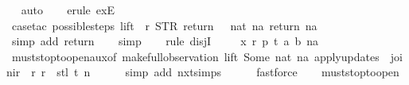 \begin{isabellebody}
\ \isamarkupfalse%
\ auto{\isacharbrackleft}{}{\isacharbrackright}\isanewline
\ \ \isamarkupfalse%
\ {\isacharparenleft}erule\ exE{\isacharparenright}\isanewline
\ \ \isamarkupfalse%
\ {\isacharparenleft}case{\isacharunderscore}tac\ {\isachardoublequoteopen}possible{\isacharunderscore}steps\ lift\ {}\ r\ {\isacharparenleft}STR\ {\isacharprime}{\isacharprime}return{\isacharprime}{\isacharprime}{\isacharparenright}\ {\isacharbrackleft}{\isacharbrackright}\ {\isacharequal}\ {\isacharbraceleft}{\isacharbar}{\isacharparenleft}nat\ na{\isacharcomma}\ return\ na{\isacharparenright}{\isacharbar}{\isacharbraceright}{\isachardoublequoteclose}{\isacharparenright}\isanewline
\ \ \isamarkupfalse%
\ \isamarkupfalse%
\ {\isacharparenleft}simp\ add{\isacharcolon}\ return{\isacharparenright}\isanewline
\ \ \isamarkupfalse%
\ simp\isanewline
\ \ \isamarkupfalse%
\ {\isacharparenleft}rule\ disjI{}{\isacharparenright}\isanewline
\ \ \isamarkupfalse%
\ \ x\ r\ p\ t\ a\ b\ na\isanewline
\ \ \ \ \isamarkupfalse%
\ must{\isacharunderscore}stop{\isacharunderscore}to{\isacharunderscore}open{\isacharunderscore}aux{}{\isacharbrackleft}of\ {\isachardoublequoteopen}{\isacharparenleft}make{\isacharunderscore}full{\isacharunderscore}observation\ lift\ {\isacharparenleft}Some\ {\isacharparenleft}nat\ na{\isacharparenright}{\isacharparenright}\ {\isacharparenleft}apply{\isacharunderscore}updates\ {\isacharbrackleft}{\isacharbrackright}\ {\isacharparenleft}join{\isacharunderscore}ir\ {\isacharbrackleft}{\isacharbrackright}\ r{\isacharparenright}\ r{\isacharparenright}\ {\isacharbrackleft}{\isacharbrackright}\ {\isacharparenleft}stl\ t{\isacharparenright}{\isacharparenright}{\isachardoublequoteclose}\ n{\isacharbrackright}\isanewline
\ \ \ \ \isamarkupfalse%
\ {\isacharparenleft}simp\ add{\isacharcolon}\ nxt{\isachardot}simps{\isacharparenright}\isanewline
\ \ \ \ \isamarkupfalse%
\ fastforce\isanewline
\ \ \isamarkupfalse%
%
\endisatagproof
{\isafoldproof}%
%
\isadelimproof
\isanewline
%
\endisadelimproof
\isanewline
\isanewline
\isanewline
{}\isamarkupfalse%
\ must{\isacharunderscore}stop{\isacharunderscore}to{\isacharunderscore}open{\isacharcolon}\isanewline

\end{isabellebody}
